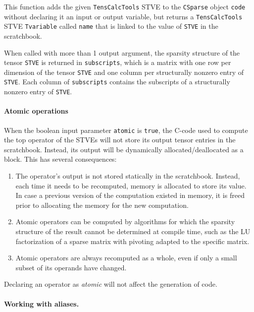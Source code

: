 \documentclass[11pt]{article}
\newcommand{\TC}{\texttt{TensCalcTools}}
\newcommand{\CS}{\texttt{CSparse}}
\begin{document}
This function adds the given \TC{} STVE to the \CS{} object
\lstinline{code} without declaring it an input or output variable, but
returns a \TC{} STVE \lstinline{Tvariable} called
\lstinline{name} that is linked to the value of \lstinline{STVE} in
the scratchbook. 

\medskip

When called with more than 1 output argument, the sparsity structure
of the tensor \lstinline{STVE} is returned in \lstinline{subscripts},
which is a matrix with one row per dimension of the tensor
\lstinline{STVE} and one column per structurally nonzero entry of
\lstinline{STVE}. Each column of \lstinline{subscripts} contains the
subscripts of a structurally nonzero entry of \lstinline{STVE}.

\paragraph*{Atomic operations}

When the boolean input parameter \lstinline{atomic} is
\lstinline{true}, the C-code used to compute the top operator of the
STVEs will not store its output tensor entries in the
scratchbook. Instead, its output will be dynamically
allocated/deallocated as a block. This has several consequences:
\begin{enumerate}
\item The operator's output is not stored statically in the
  scratchbook. Instead, each time it needs to be recomputed, memory is
  allocated to store its value. In case a previous version of the
  computation existed in memory, it is freed prior to allocating the
  memory for the new computation.

\item Atomic operators can be computed by algorithms for which the
  sparsity structure of the result cannot be determined at compile
  time, such as the LU factorization of a sparse matrix with pivoting
  adapted to the specific matrix.

\item Atomic operators are always recomputed as a whole, even if only
  a small subset of its operands have changed.
\end{enumerate}
Declaring an operator as \emph{atomic} will not affect the generation
of \matlab{} code.

\paragraph*{Working with aliases.}
\end{document}
